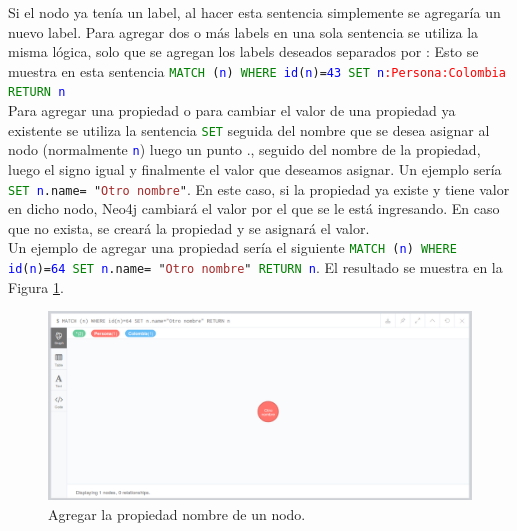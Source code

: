 \documentclass[conference]{IEEEtran}
\begin{document}
Si el nodo ya tenía un label, al hacer esta sentencia simplemente se agregaría un nuevo label. Para agregar dos o más labels en una sola sentencia se utiliza la misma lógica, solo que se agregan los labels deseados separados por : Esto se muestra en esta sentencia \texttt{\textcolor{green}{MATCH} (\textcolor{blue}{n}) \textcolor{green}{WHERE} \textcolor{blue}{id}(\textcolor{blue}{n})=\textcolor{blue}{43} \textcolor{green}{SET} \textcolor{blue}{n}\textcolor{red}{:Persona:Colombia} \textcolor{green}{RETURN} \textcolor{blue}{n}}
\\
Para agregar una propiedad o para cambiar el valor de una propiedad ya existente se utiliza la sentencia \texttt{\textcolor{green}{SET}} seguida del nombre que se desea asignar al nodo (normalmente \texttt{\textcolor{blue}{n}}) luego un punto ., seguido del nombre de la propiedad, luego el signo igual y finalmente el valor que deseamos asignar. Un ejemplo sería \texttt{\textcolor{green}{SET} \textcolor{blue}{n}.name= "\textcolor{brown}{Otro nombre}"}. En este caso, si la propiedad ya existe y tiene valor en dicho nodo, Neo4j cambiará el valor por el que se le está ingresando. En caso que no exista, se creará la propiedad y se asignará el valor. 
\\
Un ejemplo de agregar una propiedad sería el siguiente \texttt{\textcolor{green}{MATCH} (\textcolor{blue}{n}) \textcolor{green}{WHERE} \textcolor{blue}{id}(\textcolor{blue}{n})=\textcolor{blue}{64} \textcolor{green}{SET} \textcolor{blue}{n}.name= "\textcolor{brown}{Otro nombre}"  \textcolor{green}{RETURN} \textcolor{blue}{n}}. El resultado se muestra en la Figura \ref{fig28}.


\begin{figure}[H]
\begin{center}
\includegraphics[width= 0.45 \textwidth]{set_nombre1.png}
\end{center}
\caption{Agregar la propiedad nombre de un nodo.}
\label{fig28}
\end{figure}
\end{document}
